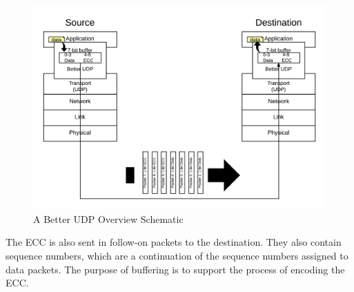 \documentclass[conference]{IEEEtran}
\theoremstyle{definition}
\begin{document}
\begin{figure}[h!]                                                          %
\centering                                                                  %
  \includegraphics[scale=0.125]{PNGs/System_Schematic-Overview}              %
\caption{A Better UDP Overview Schematic}                                   %
\label{overview_schematic}                                                  %
\end{figure}                                                                %


The ECC is also sent in follow-on packets to the
destination.  They also contain sequence numbers,
which are a continuation of the sequence numbers
assigned to data packets.
The purpose of buffering is to support the process
of encoding the ECC.
\end{document}
